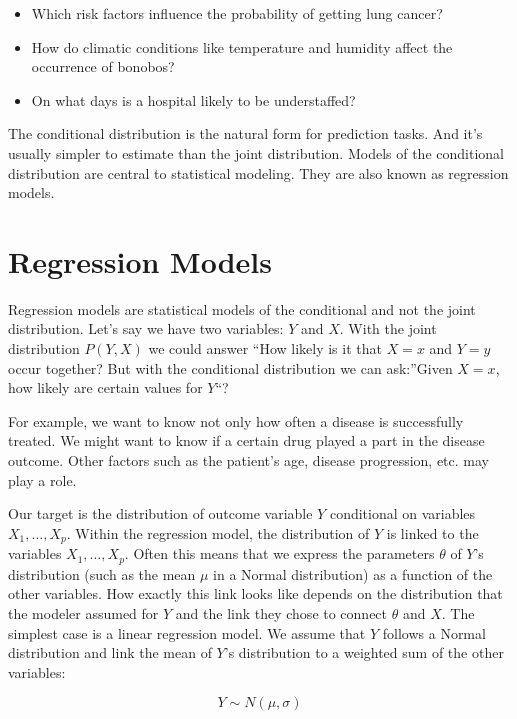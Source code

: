 \documentclass[
  10pt,
]{scrbook}
\providecommand{\tightlist}{%
  \setlength{\itemsep}{0pt}\setlength{\parskip}{0pt}}
\begin{document}
\begin{itemize}
\tightlist
\item
  Which risk factors influence the probability of getting lung cancer?
\item
  How do climatic conditions like temperature and humidity affect the occurrence of bonobos?
\item
  On what days is a hospital likely to be understaffed?
\end{itemize}

The conditional distribution is the natural form for prediction tasks.
And it's usually simpler to estimate than the joint distribution.
Models of the conditional distribution are central to statistical modeling.
They are also known as regression models.

\hypertarget{regression-models}{%
\section{Regression Models}\label{regression-models}}

Regression models are statistical models of the conditional and not the joint distribution.
Let's say we have two variables: \(Y\) and \(X\).
With the joint distribution \(P(Y,X)\) we could answer ``How likely is it that \(X=x\) and \(Y=y\) occur together?
But with the conditional distribution we can ask:''Given \(X=x\), how likely are certain values for \(Y\)``?

For example, we want to know not only how often a disease is successfully treated.
We might want to know if a certain drug played a part in the disease outcome.
Other factors such as the patient's age, disease progression, etc. may play a role.

Our target is the distribution of outcome variable \(Y\) conditional on variables \(X_1, \ldots, X_p\).
Within the regression model, the distribution of \(Y\) is linked to the variables \(X_1, \ldots, X_p\).
Often this means that we express the parameters \(\theta\) of \(Y\)'s distribution (such as the mean \(\mu\) in a Normal distribution) as a function of the other variables.
How exactly this link looks like depends on the distribution that the modeler assumed for \(Y\) and the link they chose to connect \(\theta\) and \(X\).
The simplest case is a linear regression model.
We assume that \(Y\) follows a Normal distribution and link the mean of \(Y\)'s distribution to a weighted sum of the other variables:

\[Y \sim N(\mu, \sigma)\]
\end{document}
